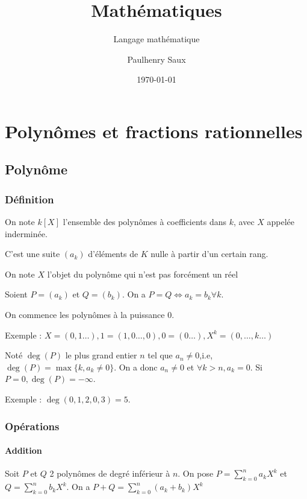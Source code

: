 \documentclass[french]{yLectureNote}
\title{Mathématiques}
\subtitle{Langage mathématique}
\author{Paulhenry Saux}
\date{\today}
\begin{document}
\setcounter{chapter}{6}

	\chapter{Polyn\^omes et fractions rationnelles}
\section{Polyn\^ome}
\subsection{Définition}
On note $k[X]$ l'ensemble des polyn\^omes à coefficients dans $k$, avec $X$ appelée inderminée.

C'est une suite $(a_k)$ d'éléments de $K$ nulle à partir d'un certain rang.

 On note $X$ l'objet du polyn\^ome qui n'est pas forcément un réel

Soient $P=(a_k)$ et $Q=(b_k)$. On a $P=Q\iff a_k=b_k \forall k$.

On commence les polyn\^omes à la puissance $0$.

Exemple : $X = (0,1\dots), 1=(1,0\dots,0), 0=(0\dots), X^k=(0,\dots,k\dots)$
\begin{definition}
Noté $\deg(P)$ le plus grand entier $n$ tel que $a_n\neq 0$,i.e, $\deg(P) = \max\{k,a_k\neq 0\}$. On a donc $a_n\neq 0$ et $\forall k>n, a_k=0$. Si $P=0, \deg(P) = -\infty$.
\end{definition}
Exemple : $\deg(0,1,2,0,3) = 5$.
%
\subsection{Opérations}
\subsubsection{Addition}
Soit $P$ et $Q$ 2 polyn\^omes de degré inférieur à $n$. On pose $P = \sum^n_{k=0} a_kX^k$ et $Q = \sum^n_{k=0} b_kX^k$. On a $P+Q = \sum^n_{k=0} (a_k+b_k)X^k$
\end{document}
